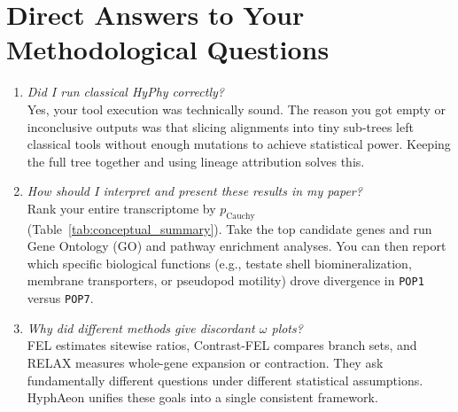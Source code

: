 \documentclass[11pt,a4paper]{article}
\begin{document}
\section{Direct Answers to Your Methodological Questions}

\begin{enumerate}
    \item \textit{Did I run classical HyPhy correctly?} \\
    Yes, your tool execution was technically sound. The reason you got empty or inconclusive outputs was that slicing alignments into tiny sub-trees left classical tools without enough mutations to achieve statistical power. Keeping the full tree together and using lineage attribution solves this.
    
    \item \textit{How should I interpret and present these results in my paper?} \\
    Rank your entire transcriptome by $p_{\text{Cauchy}}$ (Table~\ref{tab:conceptual_summary}). Take the top candidate genes and run Gene Ontology (GO) and pathway enrichment analyses. You can then report which specific biological functions (e.g., testate shell biomineralization, membrane transporters, or pseudopod motility) drove divergence in \texttt{POP1} versus \texttt{POP7}.
    
    \item \textit{Why did different methods give discordant $\omega$ plots?} \\
    FEL estimates sitewise ratios, Contrast-FEL compares branch sets, and RELAX measures whole-gene expansion or contraction. They ask fundamentally different questions under different statistical assumptions. HyphAeon unifies these goals into a single consistent framework.
\end{enumerate}
\end{document}

